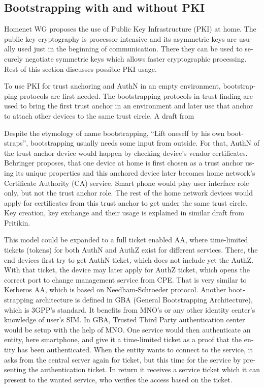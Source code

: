 \documentclass[12pt,a4paper,english]{tutthesis}
\begin{document}
\begin{otherlanguage}{english}
\section{Bootstrapping with and without PKI}
\label{sec-6-7}
\label{bootstrapping}


Homenet WG proposes the use of Public Key Infrastructure (PKI) at 
home. The public key cryptography is processor intensive and its
asymmetric keys are usually used just in the beginning of
communication. There they can be used to securely negotiate symmetric
keys which allows faster cryptographic processing.
Rest of this section discusses possible PKI usage.

To use PKI for trust anchoring and AuthN in an empty environment, bootstrapping protocols are
first needed.
The bootstrapping protocols in trust finding are used to
bring the first trust anchor in an environment and later use that anchor to
attach other devices to the same trust circle.  A draft from

Despite the etymology of name bootstrapping, ``Lift oneself by his own
bootstraps'', bootstrapping usually needs some input from outside.
For that, AuthN of the trust anchor device would happen by checking
device's vendor certificates. 
Behringer\cite{draft-behringer-bootstrap} proposes, that one device
at home is first chosen as a trust anchor  using its unique properties 
and this anchored device later becomes home
network's Certificate Authority (CA) service. Smart phone would play
user interface role only, but not the trust anchor role.
The rest of the home network devices would apply for
certificates from this trust anchor to get under the same trust circle.  Key creation,
key exchange and their usage is explained in similar draft from
Pritikin\cite{draft-pritikin-bootstrap}. 


This model could be expanded to a full ticket enabled 
AA, where time-limited tickets (tokens) for both
AuthN and AuthZ exist for different services.
There, the end devices  first try to get AuthN ticket, which 
does not include yet the AuthZ.
With that ticket, the device may later apply for AuthZ ticket, which
opens the correct port to change management service from CPE.
That is very similar to Kerberos AA, which is based on
Needham-Schroeder protocol.
Another bootstrapping architecture is 
defined in GBA (General Bootstrapping Architecture), which 
is 3GPP's standard. 
It benefits from MNO's or any other identity center's  knowledge of user's SIM.
In GBA, Trusted Third Party authentication center would be setup with the help of MNO.
One service would then authenticate an entity, here smartphone, and
give it a time-limited ticket as a proof that the entity has been authenticated.
When the entity wants to connect to the service, it asks from the central 
server again for ticket, but this time for the service by presenting
the authentication ticket. In return it receives a service ticket which
it can present to the wanted service, who verifies the access based
on the ticket. 




\end{otherlanguage}
\end{document}
